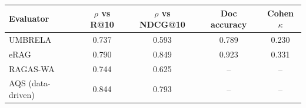\begin{tabular}{lcccc}
\toprule
Evaluator & $\rho$ vs R@10 & $\rho$ vs NDCG@10 & Doc accuracy & Cohen $\kappa$ \\
\midrule
UMBRELA & 0.737 & 0.593 & 0.789 & 0.230 \\
eRAG & 0.790 & 0.849 & 0.923 & 0.331 \\
RAGAS-WA & 0.744 & 0.625 & -- & -- \\
AQS (data-driven) & 0.844 & 0.793 & -- & -- \\
\bottomrule
\end{tabular}
